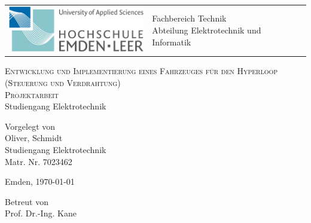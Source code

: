 \begin{titlepage}

	\vspace{-0.5cm}
	\hspace{-3.0cm}
	\begin{tabular}{p{8.0cm} p{8.0cm}}
		\includegraphics[width = 6.0cm]{img/GUI/hsel-allgemein} &
		\parbox[b]{8.0cm}{
		{\large 	Fachbereich Technik }                            \\
		{\large 	Abteilung Elektrotechnik und Informatik }
		}                                                         \\
		\\
		\hline
	\end{tabular}
	\begin{center}

		\vspace{2.5cm}
		\LARGE{\textsc{
				Entwicklung und Implementierung eines Fahrzeuges für den Hyperloop\\
				(Steuerung und Verdrahtung)
			}}\\

		\vspace{2.5cm}
		\LARGE{\textsc{
				{Projektarbeit}
			}}\\
		\large
		Studiengang Elektrotechnik

		\vspace{2cm}
		\large
		Vorgelegt von\\ Oliver, Schmidt\\ Studiengang Elektrotechnik\\ Matr. Nr. 7023462

		\vspace{1cm}
		Emden, \today

		\vspace{3cm}
		Betreut von\\ Prof. Dr.-Ing. Kane

	\end{center}
	\normalsize
\end{titlepage}
